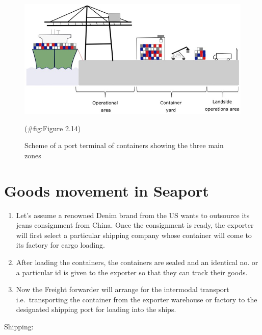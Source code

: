 \documentclass[
]{book}
\begin{document}
\begin{figure}

{\centering \includegraphics{./Images/Intro/Scheme of a port terminal of containers showing the three main zones} 

}

\caption{Scheme of a port terminal of containers showing the three main zones}(\#fig:Figure 2.14)
\end{figure}

\hypertarget{intro-Goods_movement}{%
\section{Goods movement in Seaport}\label{intro-Goods_movement}}

\begin{enumerate}
\def\labelenumi{\arabic{enumi})}
\item
  Let's assume a renowned Denim brand from the US wants to outsource its jeans consignment from China. Once the consignment is ready, the exporter will first select a particular shipping company whose container will come to its factory for cargo loading.
\item
  After loading the containers, the containers are sealed and an identical no. or a particular id is given to the exporter so that they can track their goods.
\item
  Now the Freight forwarder will arrange for the intermodal transport i.e.~transporting the container from the exporter warehouse or factory to the designated shipping port for loading into the ships.
\end{enumerate}

Shipping:
\end{document}
